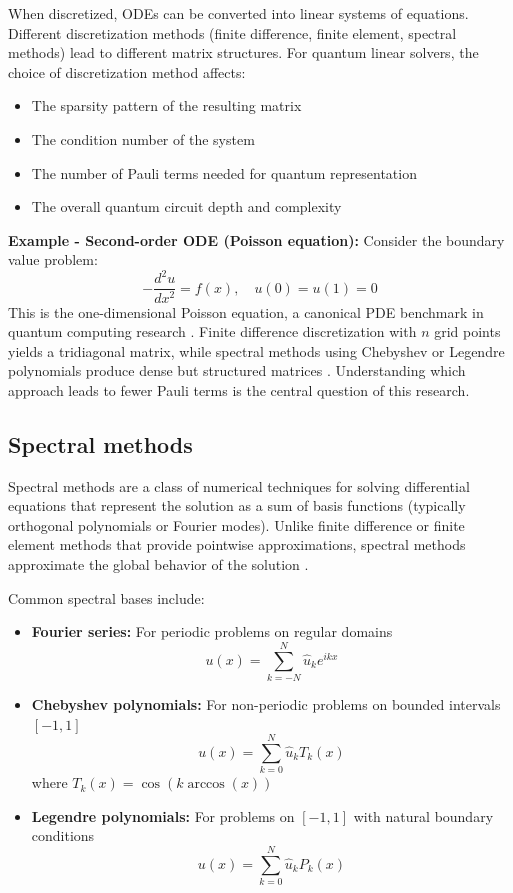 \documentclass[a4paper,12pt]{amsart}
\begin{document}
When discretized, ODEs can be converted into linear systems of equations. Different discretization methods (finite difference, finite element, spectral methods) lead to different matrix structures. For quantum linear solvers, the choice of discretization method affects:
\begin{itemize}
\item The sparsity pattern of the resulting matrix
\item The condition number of the system
\item The number of Pauli terms needed for quantum representation
\item The overall quantum circuit depth and complexity
\end{itemize}

\textbf{Example - Second-order ODE (Poisson equation):}
Consider the boundary value problem:
\begin{equation}
-\frac{d^2u}{dx^2} = f(x), \quad u(0) = u(1) = 0
\end{equation}
This is the one-dimensional Poisson equation, a canonical PDE benchmark in quantum computing research \cite{mukhanbet2024poisson}. Finite difference discretization with $n$ grid points yields a tridiagonal matrix, while spectral methods using Chebyshev or Legendre polynomials produce dense but structured matrices \cite{childs2020spectral}. Understanding which approach leads to fewer Pauli terms is the central question of this research.

\subsection{Spectral methods}
Spectral methods are a class of numerical techniques for solving differential equations that represent the solution as a sum of basis functions (typically orthogonal polynomials or Fourier modes). Unlike finite difference or finite element methods that provide pointwise approximations, spectral methods approximate the global behavior of the solution \cite{scherer2019mathematics}.

Common spectral bases include:
\begin{itemize}
\item \textbf{Fourier series:} For periodic problems on regular domains
\begin{equation}
u(x) = \sum_{k=-N}^{N} \hat{u}_k e^{ikx}
\end{equation}

\item \textbf{Chebyshev polynomials:} For non-periodic problems on bounded intervals $[-1,1]$
\begin{equation}
u(x) = \sum_{k=0}^{N} \hat{u}_k T_k(x)
\end{equation}
where $T_k(x) = \cos(k \arccos(x))$

\item \textbf{Legendre polynomials:} For problems on $[-1, 1]$ with natural boundary conditions
\begin{equation}
u(x) = \sum_{k=0}^{N} \hat{u}_k P_k(x)
\end{equation}
\end{itemize}
\end{document}
